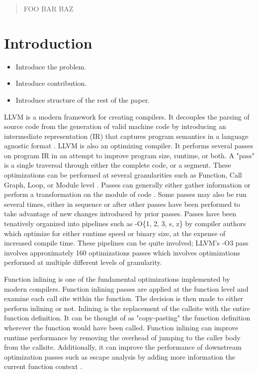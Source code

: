 \documentclass[nohyperref]{article}
\theoremstyle{plain}
\theoremstyle{definition}
\theoremstyle{remark}
\begin{document}
\begin{abstract}
FOO BAR BAZ
\end{abstract}

\section{Introduction}
\label{introduction}
\begin{itemize}
\item Introduce the problem\@.
\item Introduce contribution\@.
\item Introduce structure of the rest of the paper\@.
\end{itemize}

LLVM is a modern framework for creating compilers. It decouples the parsing of source code from the generation of valid machine code by introducing an intermediate representation (IR) that captures program semantics in a language agnostic format \cite{llvm-paper}. LLVM is also an optimizing compiler. It performs several passes on program IR in an attempt to improve program size, runtime, or both. A "pass" is a single traversal through either the complete code, or a segment. These optimizations can be performed at several granularities such as Function, Call Graph, Loop, or Module level \cite{lattner2008}. Passes can generally either gather information or perform a transformation on the module of code \cite{llvm-pass-docs}. Some passes may also be run several times, either in sequence or after other passes have been performed to take advantage of new changes introduced by prior passes. Passes have been tenatively organized into pipelines such as -O\{1, 2, 3, s, z\} by compiler authors which optimize for either runtime speed or binary size, at the expense of increased compile time. These pipelines can be quite involved; LLVM's -O3 pass involves approximately 160 optimizations passes which involves optimizations performed at multiple different levels of granularity.


Function inlining is one of the fundamental optimizations implemented by modern compilers. Function inlining passes are applied at the function level and examine each call site within the function. The decision is then made to either perform inlining or not. Inlining is the replacement of the callsite with the entire function definition. It can be thought of as "copy-pasting" the function definition wherever the function would have been called. Function inlining can improve runtime performance by removing the overhead of jumping to the caller body from the callsite. Additionally, it can improve the performance of downstream optimization passes such as escape analysis by adding more information the current function context \cite{Theodoridis_Grosser_Su_2022}.
\end{document}
